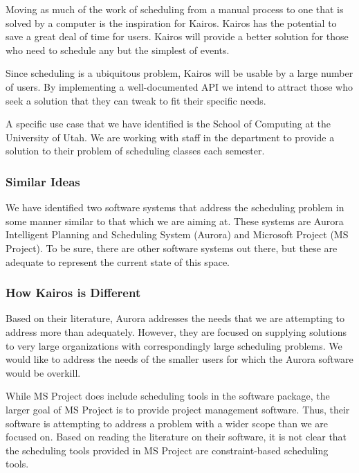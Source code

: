 \documentclass{extarticle}
\begin{document}
Moving as much of the work of scheduling from a manual process to one that is solved by a computer is the
inspiration for Kairos.  Kairos has the potential to save a great deal of time for users.  Kairos will provide a
better solution for those who need to schedule any but the simplest of events.

Since scheduling is a ubiquitous problem, Kairos will be usable by a large number of users.  By implementing a
well-documented API we intend to attract those who seek a solution that they can tweak to fit their specific needs.

A specific use case that we have identified is the School of Computing at the University of Utah.  We are working
with staff in the department to provide a solution to their problem of scheduling classes each semester.

\subsubsection{Similar Ideas}
We have identified two software systems that address the scheduling problem in some manner similar to that which
we are aiming at.  These systems are Aurora Intelligent Planning and Scheduling System (Aurora) and Microsoft
Project (MS Project).  To be sure, there are other software systems out there, but these are adequate to represent
the current state of this space.

\subsubsection{How Kairos is Different}
Based on their literature, Aurora addresses the needs that we are attempting to address more than adequately.
However, they are focused on supplying solutions to very large organizations with correspondingly large
scheduling problems.  We would like to address the needs of the smaller users for which the Aurora software would
be overkill.

While MS Project does include scheduling tools in the software package, the larger goal of MS Project is to provide
project management software.  Thus, their software is attempting to address a problem with a wider scope than we
are focused on.  Based on reading the literature on their software, it is not clear that the scheduling tools 
provided in MS Project are constraint-based scheduling tools.
\end{document}
